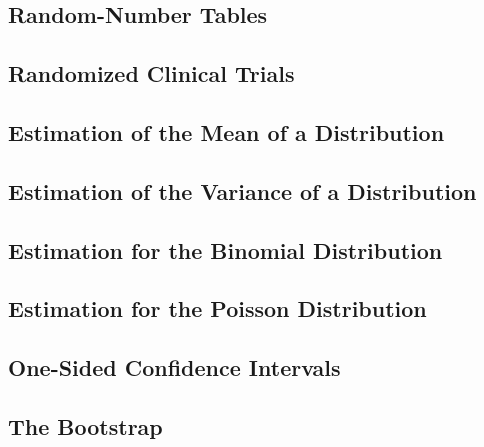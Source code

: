 \documentclass[12pt,]{article}
\begin{document}
\hypertarget{random-number-tables}{%
\subsection{Random-Number Tables}\label{random-number-tables}}

\hypertarget{randomized-clinical-trials}{%
\subsection{Randomized Clinical
Trials}\label{randomized-clinical-trials}}

\hypertarget{estimation-of-the-mean-of-a-distribution}{%
\subsection{Estimation of the Mean of a
Distribution}\label{estimation-of-the-mean-of-a-distribution}}

\hypertarget{estimation-of-the-variance-of-a-distribution}{%
\subsection{Estimation of the Variance of a
Distribution}\label{estimation-of-the-variance-of-a-distribution}}

\hypertarget{estimation-for-the-binomial-distribution}{%
\subsection{Estimation for the Binomial
Distribution}\label{estimation-for-the-binomial-distribution}}

\hypertarget{estimation-for-the-poisson-distribution}{%
\subsection{Estimation for the Poisson
Distribution}\label{estimation-for-the-poisson-distribution}}

\hypertarget{one-sided-confidence-intervals}{%
\subsection{One-Sided Confidence
Intervals}\label{one-sided-confidence-intervals}}

\hypertarget{the-bootstrap}{%
\subsection{The Bootstrap}\label{the-bootstrap}}
\end{document}
